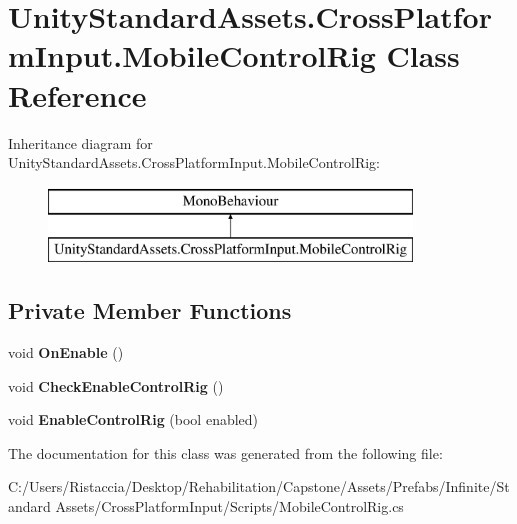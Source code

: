 \hypertarget{class_unity_standard_assets_1_1_cross_platform_input_1_1_mobile_control_rig}{}\section{Unity\+Standard\+Assets.\+Cross\+Platform\+Input.\+Mobile\+Control\+Rig Class Reference}
\label{class_unity_standard_assets_1_1_cross_platform_input_1_1_mobile_control_rig}
Inheritance diagram for Unity\+Standard\+Assets.\+Cross\+Platform\+Input.\+Mobile\+Control\+Rig\+:\begin{figure}[H]
\begin{center}
\leavevmode
\includegraphics[height=2.000000cm]{class_unity_standard_assets_1_1_cross_platform_input_1_1_mobile_control_rig}
\end{center}
\end{figure}
\subsection*{Private Member Functions}
\begin{DoxyCompactItemize}
\item 
\mbox{\label{class_unity_standard_assets_1_1_cross_platform_input_1_1_mobile_control_rig_a0b3e00111f5de719d67483035423f42f}} 
void {\bfseries On\+Enable} ()
\item 
\mbox{\label{class_unity_standard_assets_1_1_cross_platform_input_1_1_mobile_control_rig_a9c108c3f3efeced8dc96be91608b46d3}} 
void {\bfseries Check\+Enable\+Control\+Rig} ()
\item 
\mbox{\label{class_unity_standard_assets_1_1_cross_platform_input_1_1_mobile_control_rig_a41daf1bab70720498e338a4ed4c5a790}} 
void {\bfseries Enable\+Control\+Rig} (bool enabled)
\end{DoxyCompactItemize}


The documentation for this class was generated from the following file\+:\begin{DoxyCompactItemize}
\item 
C\+:/\+Users/\+Ristaccia/\+Desktop/\+Rehabilitation/\+Capstone/\+Assets/\+Prefabs/\+Infinite/\+Standard Assets/\+Cross\+Platform\+Input/\+Scripts/Mobile\+Control\+Rig.\+cs\end{DoxyCompactItemize}
